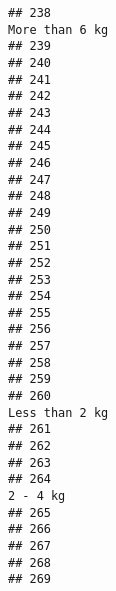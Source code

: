 \documentclass[
]{article}
\begin{document}
\begin{verbatim}
## 238                                                              More than 6 kg
## 239                                                                            
## 240                                                                            
## 241                                                                            
## 242                                                                            
## 243                                                                            
## 244                                                                            
## 245                                                                            
## 246                                                                            
## 247                                                                            
## 248                                                                            
## 249                                                                            
## 250                                                                            
## 251                                                                            
## 252                                                                            
## 253                                                                            
## 254                                                                            
## 255                                                                            
## 256                                                                            
## 257                                                                            
## 258                                                                            
## 259                                                                            
## 260                                                              Less than 2 kg
## 261                                                                            
## 262                                                                            
## 263                                                                            
## 264                                                                    2 - 4 kg
## 265                                                                            
## 266                                                                            
## 267                                                                            
## 268                                                                            
## 269                                                                            

\end{verbatim}
\end{document}

